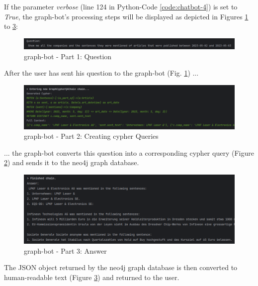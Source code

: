 If the parameter \emph{verbose} (line 124 in Python-Code \ref{code:chatbot-4}) is set to \emph{True},
the \gls{graph-bot}'s processing steps will be displayed as depicted in Figures \ref{fig:chatbot-1} to \ref{fig:chatbot-3}:

\begin{figure}[H]   %
    \centering
    \includegraphics[width=\textwidth]{Assets/chatbot-question}
    \caption{\gls{graph-bot} - Part 1: Question}
    \label{fig:chatbot-1}
\end{figure}

After the user has sent his question to the \gls{graph-bot} (Fig. \ref{fig:chatbot-1}) ...
\begin{figure}[H]   %
    \centering
    \includegraphics[width=\textwidth]{Assets/chatbot-processing}
    \caption{\gls{graph-bot} - Part 2: Creating \gls{cypher} Queries}
    \label{fig:chatbot-2}
\end{figure}
... the \gls{graph-bot} converts this question into a corresponding \gls{cypher} query (Figure \ref{fig:chatbot-2}) and sends it to the neo4j graph database.

\begin{figure}[H]   %
    \centering
    \includegraphics[width=\textwidth]{Assets/chatbot-answer}
    \caption{\gls{graph-bot} - Part 3: Answer}
    \label{fig:chatbot-3}
\end{figure}

The JSON object returned by the neo4j graph database is then converted to human-readable text (Figure \ref{fig:chatbot-3}) and returned to the user.

